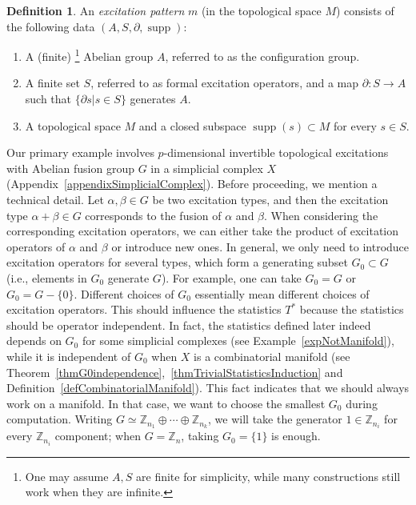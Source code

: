 \documentclass[reprint, amsmath, amssymb, showpacs, floatfix, longbibliography, aps, twocolumn, superscriptaddress, nofootinbib]{revtex4-2}
\newcommand{\ZZ}{{\mathbb Z}}
\newcommand{\supp}{\operatorname{supp}}
\theoremstyle{definition}
\newtheorem{definition}{Definition}[section]
\begin{document}
\begin{definition}\label{defexcitationModel}
	An \textit{excitation pattern} \(m\) (in the topological space $M$) consists of the following data $(A,S,\partial,\supp)$:
	\begin{enumerate}
		\item A (finite) \footnote{One may assume $A,S$ are finite for simplicity, while many constructions still work when they are infinite.} Abelian group \(A\), referred to as the configuration group.
		\item A finite set \(S\), referred to as formal excitation operators, and a map \(\partial: S \longrightarrow A\) such that $\{\partial s|s\in S\}$ generates \(A\).
		\item A topological space $M$ and a closed subspace \(\operatorname{supp}(s) \subset M\) for every $s\in S$.
	\end{enumerate}

\end{definition}



Our primary example involves \(p\)-dimensional invertible topological excitations with Abelian fusion group \(G\) in a simplicial complex $X$ (Appendix~\ref{appendixSimplicialComplex}). Before proceeding, we mention a technical detail. Let $\alpha,\beta\in G$ be two excitation types, and then the excitation type $\alpha+\beta\in G$ corresponds to the fusion of $\alpha$ and $\beta$. When considering the corresponding excitation operators, we can either take the product of excitation operators of $\alpha$ and $\beta$ or introduce new ones. In general, we only need to introduce excitation operators for several types, which form a generating subset $G_0\subset G$ (i.e., elements in $G_0$ generate $G$). For example, one can take $G_0=G$ or $G_0=G-\{0\}$. Different choices of $G_0$ essentially mean different choices of excitation operators. This should influence the statistics $T^*$ because the statistics should be operator independent.  In fact, the statistics defined later indeed depends on $G_0$ for some simplicial complexes (see Example~\ref{expNotManifold}), while it is independent of $G_0$ when $X$ is a combinatorial manifold (see Theorem~\ref{thmG0independence},~\ref{thmTrivialStatisticsInduction} and Definition~\ref{defCombinatorialManifold}). This fact indicates that we should always work on a manifold. In that case, we want to choose the smallest $G_0$ during computation. Writing $G\simeq \ZZ_{n_1}\oplus\cdots\oplus \ZZ_{n_k}$, we will take the generator $1\in \ZZ_{n_i}$ for every $\ZZ_{n_i}$ component; when $G=\ZZ_n$, taking $G_0=\{1\}$ is enough.
\end{document}
